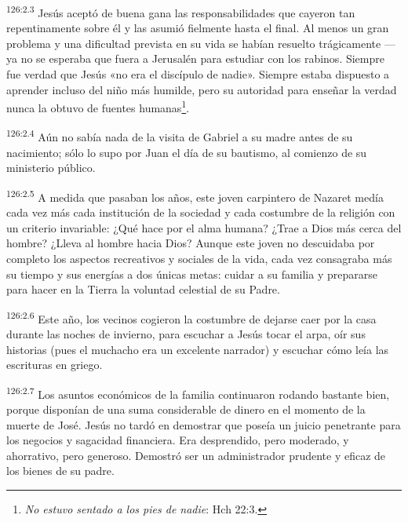 \par
\textsuperscript{126:2.3} Jesús aceptó de buena gana las responsabilidades que cayeron tan repentinamente sobre él y las asumió fielmente hasta el final. Al menos un gran problema y una dificultad prevista en su vida se habían resuelto trágicamente ---ya no se esperaba que fuera a Jerusalén para estudiar con los rabinos. Siempre fue verdad que Jesús «no era el discípulo de nadie». Siempre estaba dispuesto a aprender incluso del niño más humilde, pero su autoridad para enseñar la verdad nunca la obtuvo de fuentes humanas\footnote{\textit{No estuvo sentado a los pies de nadie}: Hch 22:3.}.

\par
\textsuperscript{126:2.4} Aún no sabía nada de la visita de Gabriel a su madre antes de su nacimiento; sólo lo supo por Juan el día de su bautismo, al comienzo de su ministerio público.

\par
\textsuperscript{126:2.5} A medida que pasaban los años, este joven carpintero de Nazaret medía cada vez más cada institución de la sociedad y cada costumbre de la religión con un criterio invariable: ¿Qué hace por el alma humana? ¿Trae a Dios más cerca del hombre? ¿Lleva al hombre hacia Dios? Aunque este joven no descuidaba por completo los aspectos recreativos y sociales de la vida, cada vez consagraba más su tiempo y sus energías a dos únicas metas: cuidar a su familia y prepararse para hacer en la Tierra la voluntad celestial de su Padre.

\par
\textsuperscript{126:2.6} Este año, los vecinos cogieron la costumbre de dejarse caer por la casa durante las noches de invierno, para escuchar a Jesús tocar el arpa, oír sus historias (pues el muchacho era un excelente narrador) y escuchar cómo leía las escrituras en griego.

\par
\textsuperscript{126:2.7} Los asuntos económicos de la familia continuaron rodando bastante bien, porque disponían de una suma considerable de dinero en el momento de la muerte de José. Jesús no tardó en demostrar que poseía un juicio penetrante para los negocios y sagacidad financiera. Era desprendido, pero moderado, y ahorrativo, pero generoso. Demostró ser un administrador prudente y eficaz de los bienes de su padre.

